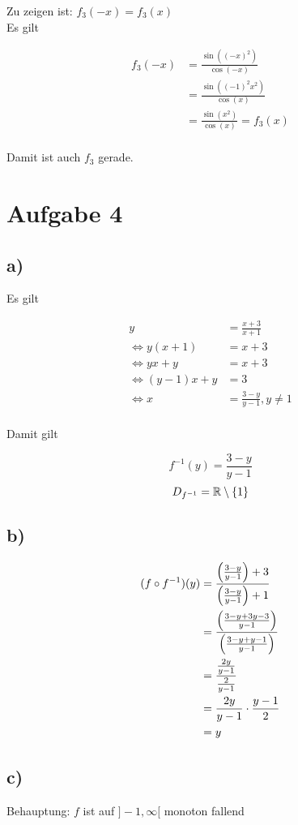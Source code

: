 \documentclass[a4paper, 11pt]{article}
\begin{document}
Zu zeigen ist: \(f_3(-x) = f_3(x)\) \\
Es gilt

\begin{align*}
    f_3(-x) &= \frac{\sin((-x)^2)}{\cos(-x)} \\
    &= \frac{\sin((-1)^2 x^2)}{\cos(x)} \\
    &= \frac{\sin(x^2)}{\cos(x)} = f_3(x) \\
\end{align*}

Damit ist auch \(f_3\) gerade.

\section{Aufgabe 4}
\label{sec:org66e092a}
\subsection{a)}
\label{sec:orga18eb4d}
Es gilt

\begin{align*}
    y &= \frac{x+3}{x+1} \\
    \Leftrightarrow y(x+1) &= x+3 \\
    \Leftrightarrow yx+y &= x+3 \\
    \Leftrightarrow (y-1)x+y &= 3 \\
    \Leftrightarrow x &= \frac{3-y}{y-1}, y \neq 1 \\
\end{align*}

Damit gilt

$$ f^{-1}(y) = \frac{3-y}{y-1} $$
$$ D_{f^{-1}} = \mathbb{R} \setminus \{1\} $$

\subsection{b)}
\label{sec:orge5d7299}
\begin{align*}
    (f \circ f^{-1})(y) &= \frac{\left(\frac{3-y}{y-1}\right)+3}{\left(\frac{3-y}{y-1}\right)+1} \\
    &= \frac{\left(\frac{3-y + 3y-3}{y-1}\right)}{\left(\frac{3-y + y-1}{y-1}\right)} \\
    &= \frac{\frac{2y}{y-1}}{\frac{2}{y-1}} \\
    &= \frac{2y}{y-1} \cdot \frac{y-1}{2} \\
    &= y \\
\end{align*}

\subsection{c)}
\label{sec:org7a8420c}
Behauptung: \(f\) ist auf \(]-1, \infty[\) monoton fallend \\
\end{document}
